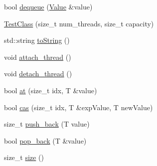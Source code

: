 \begin{DoxyCompactItemize}
bool \hyperlink{class_test_class_a89fcb2cb3842285e9de88cdb1ac9ff73}{dequeue} (\hyperlink{hash__map_2test_object_8h_ad777bf08d8e2b01df17ba5e3c51ae11f}{Value} \&value)
\item 
\hyperlink{class_test_class_ab3dbc7a67da46dda1125f7dee533aca2}{Test\+Class} (size\+\_\+t num\+\_\+threads, size\+\_\+t capacity)
\item 
std\+::string \hyperlink{class_test_class_a84e73a91ede625887472a307235d6de5}{to\+String} ()
\item 
void \hyperlink{class_test_class_a7e6bce4c39c047282ea8c1f1485a260b}{attach\+\_\+thread} ()
\item 
void \hyperlink{class_test_class_a79b3a395c8a1fac7a156228a27d829cc}{detach\+\_\+thread} ()
\item 
bool \hyperlink{class_test_class_ac0b38d5b2783d2989a1351718547c8ba}{at} (size\+\_\+t idx, T \&value)
\item 
bool \hyperlink{class_test_class_abb0a6be1ab9e43fd5fd40fe8c3b2e5a8}{cas} (size\+\_\+t idx, T \&exp\+Value, T new\+Value)
\item 
size\+\_\+t \hyperlink{class_test_class_a64245ead64233bf7bc8948ba339785c4}{push\+\_\+back} (T value)
\item 
bool \hyperlink{class_test_class_a50774f0c4fe248799aae9114a9f01233}{pop\+\_\+back} (T \&value)
\item 
size\+\_\+t \hyperlink{class_test_class_af2230f298ab3ef4ebf71aa7afa3fb6ca}{size} ()
\end{DoxyCompactItemize}

